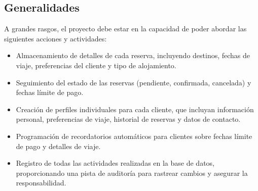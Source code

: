 \documentclass{article}
\begin{document}
\subsection{Generalidades}
A grandes rasgos, el proyecto debe estar en la capacidad de poder abordar las siguientes acciones y actividades:
\begin{itemize}
    \item Almacenamiento de detalles de cada reserva, incluyendo destinos, fechas de viaje, preferencias del cliente y tipo de alojamiento.
    \item Seguimiento del estado de las reservas (pendiente, confirmada, cancelada) y fechas límite de pago.
    \item Creación de perfiles individuales para cada cliente, que incluyan información personal, preferencias de viaje, historial de reservas y datos de contacto.
    \item Programación de recordatorios automáticos para clientes sobre fechas límite de pago y detalles de viaje.
    \item Registro de todas las actividades realizadas en la base de datos, proporcionando una pista de auditoría para rastrear cambios y asegurar la responsabilidad.
\end{itemize}
\end{document}
